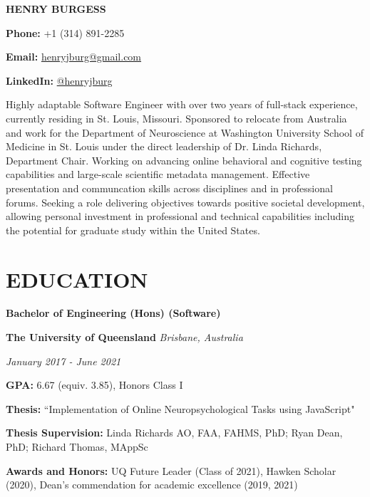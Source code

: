 \documentclass{article}
\begin{document}
  {\Huge\textbf{\uppercase{Henry Burgess}}} \hfill \begin{minipage}{0.26\linewidth}

  \textbf{Phone:} +1 (314) 891-2285

  \textbf{Email:} \href{mailto:henryjburg@gmail.com}{henryjburg@gmail.com}

  \textbf{LinkedIn:} \href{https://www.linkedin.com/in/henryjburg/}{@henryjburg}

  \end{minipage}

  \medbreak

  Highly adaptable Software Engineer with over two years of full-stack experience, currently residing in St. Louis, Missouri.
  Sponsored to relocate from Australia and work for the Department of Neuroscience at Washington University School of Medicine in St. Louis under the direct leadership of Dr. Linda Richards, Department Chair.
  Working on advancing online behavioral and cognitive testing capabilities and large-scale scientific metadata management. Effective presentation and communcation skills across disciplines and in professional forums.
  Seeking a role delivering objectives towards positive societal development, allowing personal investment in professional and technical capabilities including the potential for graduate study within the United States.

  \section*{\centering\uppercase{Education}}

  {\large\textbf{Bachelor of Engineering (Hons) (Software)}}

  \medbreak

  \textbf{The University of Queensland} \hfill \textit{Brisbane, Australia}

  \textit{January 2017 - June 2021}

  \textbf{GPA:} 6.67 (equiv. 3.85), Honors Class I

  \textbf{Thesis:} ``Implementation of Online Neuropsychological Tasks using JavaScript"

  \textbf{Thesis Supervision:} Linda Richards AO, FAA, FAHMS, PhD; Ryan Dean, PhD; Richard Thomas, MAppSc

  \textbf{Awards and Honors:} UQ Future Leader (Class of 2021), Hawken Scholar (2020), Dean's commendation for academic excellence (2019, 2021)
\end{document}
